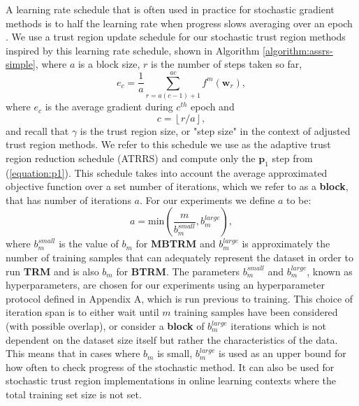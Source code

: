 \documentclass[letterpaper,12pt,titlepage,oneside,final]{book}
\begin{document}
	A learning rate schedule that is often used in practice for stochastic gradient methods is to half the learning rate when progress slows averaging over an epoch \cite{tutorial}. We use a trust region update schedule for our stochastic trust region methods inspired by this learning rate schedule, shown in Algorithm \ref{algorithm:assrs-simple}, where $a$ is a block size, $r$ is the number of steps taken so far,
	\begin{equation}
	e_{c} = \frac{1}{a}\sum_{r = a(c-1) + 1}^{ac}{f^{m}(\mathbf{w}_{r})},
	\end{equation}
	where $e_{c}$ is the average gradient during $c^{th}$ epoch and
	\begin{equation}
	c = \left \lfloor{r/a}\right \rfloor,
	\end{equation}
	and recall that $\gamma$ is the trust region size, or "step size" in the context of adjusted trust region methods.
	 We refer to this schedule we use as the adaptive trust region reduction schedule (ATRRS) and compute only the $\mathbf{p}_{1}$ step from (\ref{equation:p1}). This schedule takes into account the average approximated objective function over a set number of iterations, which we refer to as a \textbf{block}, that has number of iterations $a$. For our experiments we define $a$ to be:
	\begin{equation}
	a = \text{min}(\frac{m}{b_{m}^{small}}, b_{m}^{large}),
	\end{equation}
	where $b_{m}^{small}$ is the value of $b_{m}$ for \textbf{MBTRM} and $b_{m}^{large}$ is approximately the number of training samples that can adequately represent the dataset in order to run \textbf{TRM} and is also $b_{m}$ for \textbf{BTRM}. The parameters $b_{m}^{small}$ and $b_{m}^{large}$, known as hyperparameters, are chosen for our experiments using an hyperparameter protocol defined in Appendix A, which is run previous to training. This choice of iteration span is to either wait until $m$ training samples have been considered (with possible overlap), or consider a \textbf{block} of $b_{m}^{large}$ iterations which is not dependent on the dataset size itself but rather the characteristics of the data. This means that in cases where $b_{m}$ is small, $b_{m}^{large}$ is used as an upper bound for how often to check progress of the stochastic method. It can also be used for stochastic trust region implementations in online learning contexts where the total training set size is not set.
	
\end{document}
